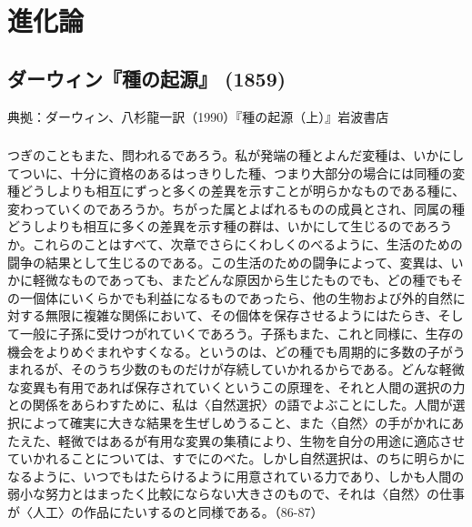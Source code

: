 
\chapter{進化論}



\section{ダーウィン『種の起源』 (1859)}



典拠：ダーウィン、八杉龍一訳（1990）『種の起源（上）』岩波書店

\subsection{}



つぎのこともまた、問われるであろう。私が発端の種とよんだ変種は、いかにしてついに、十分に資格のあるはっきりした種、つまり大部分の場合には同種の変種どうしよりも相互にずっと多くの差異を示すことが明らかなものである種に、変わっていくのであろうか。ちがった属とよばれるものの成員とされ、同属の種どうしよりも相互に多くの差異を示す種の群は、いかにして生じるのであろうか。これらのことはすべて、次章でさらにくわしくのべるように、生活のための闘争の結果として生じるのである。この生活のための闘争によって、変異は、いかに軽微なものであっても、またどんな原因から生じたものでも、どの種でもその一個体にいくらかでも利益になるものであったら、他の生物および外的自然に対する無限に複雑な関係において、その個体を保存させるようにはたらき、そして一般に子孫に受けつがれていくであろう。子孫もまた、これと同様に、生存の機会をよりめぐまれやすくなる。というのは、どの種でも周期的に多数の子がうまれるが、そのうち少数のものだけが存続していかれるからである。どんな軽微な変異も有用であれば保存されていくというこの原理を、それと人間の選択の力との関係をあらわすために、私は〈自然選択〉の語でよぶことにした。人間が選択によって確実に大きな結果を生ぜしめうること、また〈自然〉の手がかれにあたえた、軽微ではあるが有用な変異の集積により、生物を自分の用途に適応させていかれることについては、すでにのべた。しかし自然選択は、のちに明らかになるように、いつでもはたらけるように用意されている力であり、しかも人間の弱小な努力とはまったく比較にならない大きさのもので、それは〈自然〉の仕事が〈人工〉の作品にたいするのと同様である。（86-87）

\subsection{}



